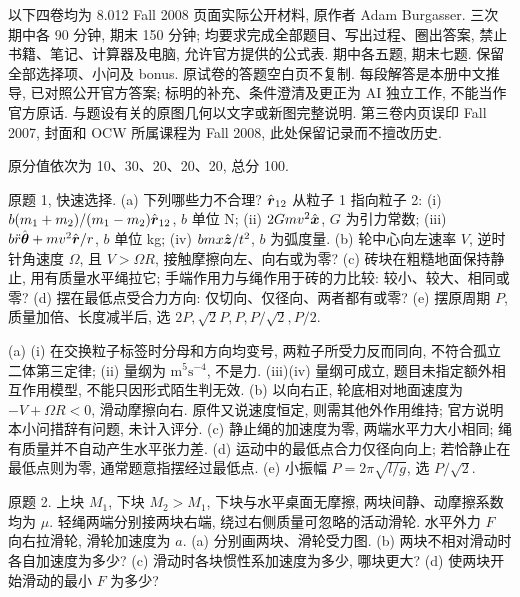 \label{ch:exams}
以下四卷均为 8.012 Fall 2008 页面实际公开材料, 原作者 Adam Burgasser. 三次期中各 90 分钟, 期末 150 分钟; 均要求完成全部题目、写出过程、圈出答案, 禁止书籍、笔记、计算器及电脑, 允许官方提供的公式表. 期中各五题, 期末七题. 保留全部选择项、小问及 bonus. 原试卷的答题空白页不复制. 每段解答是本册中文推导, 已对照公开官方答案; 标明的补充、条件澄清及更正为 AI 独立工作, 不能当作官方原话. 与题设有关的原图几何以文字或新图完整说明. 第三卷内页误印 Fall 2007, 封面和 OCW 所属课程为 Fall 2008, 此处保留记录而不擅改历史.

原分值依次为 10、30、20、20、20, 总分 100.
\begin{exercise}
原题 1, 快速选择. (a) 下列哪些力不合理? $\hat{\boldsymbol{r}}_{12}$ 从粒子 1 指向粒子 2: (i) $b(m_1+m_2)/(m_1-m_2)\hat{\boldsymbol{r}}_{12}$, $b$ 单位 N; (ii) $2Gmv^2\hat{\boldsymbol{x}}$, $G$ 为引力常数; (iii) $b\ddot r\hat{\boldsymbol{\theta}}+mv^2\hat{\boldsymbol{r}}/r$, $b$ 单位 kg; (iv) $bmx\hat{\boldsymbol{z}}/t^2$, $b$ 为弧度量. (b) 轮中心向左速率 $V$, 逆时针角速度 $\Omega$, 且 $V>\Omega R$, 接触摩擦向左、向右或为零? (c) 砖块在粗糙地面保持静止, 用有质量水平绳拉它; 手端作用力与绳作用于砖的力比较: 较小、较大、相同或零? (d) 摆在最低点受合力方向: 仅切向、仅径向、两者都有或零? (e) 摆原周期 $P$, 质量加倍、长度减半后, 选 $2P,\sqrt2P,P,P/\sqrt2,P/2$.
\end{exercise}
\begin{solution}
(a) (i) 在交换粒子标签时分母和方向均变号, 两粒子所受力反而同向, 不符合孤立二体第三定律; (ii) 量纲为 $\mathrm{m^5s^{-4}}$, 不是力. (iii)(iv) 量纲可成立, 题目未指定额外相互作用模型, 不能只因形式陌生判无效. (b) 以向右正, 轮底相对地面速度为 $-V+\Omega R<0$, 滑动摩擦向右. 原件又说速度恒定, 则需其他外作用维持; 官方说明本小问措辞有问题, 未计入评分. (c) 静止绳的加速度为零, 两端水平力大小相同; 绳有质量并不自动产生水平张力差. (d) 运动中的最低点合力仅径向向上; 若恰静止在最低点则为零, 通常题意指摆经过最低点. (e) 小振幅 $P=2\pi\sqrt{l/g}$, 选 $P/\sqrt2$.
\end{solution}
\begin{exercise}
原题 2. 上块 $M_1$, 下块 $M_2>M_1$, 下块与水平桌面无摩擦, 两块间静、动摩擦系数均为 $\mu$. 轻绳两端分别接两块右端, 绕过右侧质量可忽略的活动滑轮. 水平外力 $F$ 向右拉滑轮, 滑轮加速度为 $a$. (a) 分别画两块、滑轮受力图. (b) 两块不相对滑动时各自加速度为多少? (c) 滑动时各块惯性系加速度为多少, 哪块更大? (d) 使两块开始滑动的最小 $F$ 为多少?
\end{exercise}
